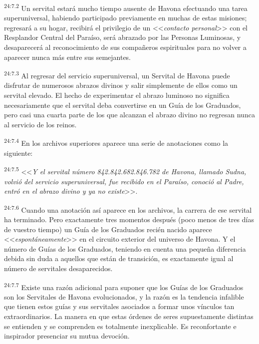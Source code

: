\par
\textsuperscript{24:7.2} Un servital estará mucho tiempo ausente de Havona efectuando una tarea superuniversal, habiendo participado previamente en muchas de estas misiones; regresará a su hogar, recibirá el privilegio de un <<\textit{contacto personal}>> con el Resplandor Central del Paraíso, será abrazado por las Personas Luminosas, y desaparecerá al reconocimiento de sus compañeros espirituales para no volver a aparecer nunca más entre sus semejantes.

\par
\textsuperscript{24:7.3} Al regresar del servicio superuniversal, un Servital de Havona puede disfrutar de numerosos abrazos divinos y salir simplemente de ellos como un servital elevado. El hecho de experimentar el abrazo luminoso no significa necesariamente que el servital deba convertirse en un Guía de los Graduados, pero casi una cuarta parte de los que alcanzan el abrazo divino no regresan nunca al servicio de los reinos.

\par
\textsuperscript{24:7.4} En los archivos superiores aparece una serie de anotaciones como la siguiente:

\par
\textsuperscript{24:7.5} <<\textit{Y el servital número 842.842.682.846.782 de Havona, llamado Sudna, volvió del servicio superuniversal, fue recibido en el Paraíso, conoció al Padre, entró en el abrazo divino y ya no existe}>>.

\par
\textsuperscript{24:7.6} Cuando una anotación así aparece en los archivos, la carrera de ese servital ha terminado. Pero exactamente tres momentos después (poco menos de tres días de vuestro tiempo) un Guía de los Graduados recién nacido aparece <<\textit{espontáneamente}>> en el circuito exterior del universo de Havona. Y el número de Guías de los Graduados, teniendo en cuenta una pequeña diferencia debida sin duda a aquellos que están de transición, es exactamente igual al número de servitales desaparecidos.

\par
\textsuperscript{24:7.7} Existe una razón adicional para suponer que los Guías de los Graduados son los Servitales de Havona evolucionados, y la razón es la tendencia infalible que tienen estos guías y sus servitales asociados a formar unos vínculos tan extraordinarios. La manera en que estas órdenes de seres supuestamente distintas se entienden y se comprenden es totalmente inexplicable. Es reconfortante e inspirador presenciar su mutua devoción.

